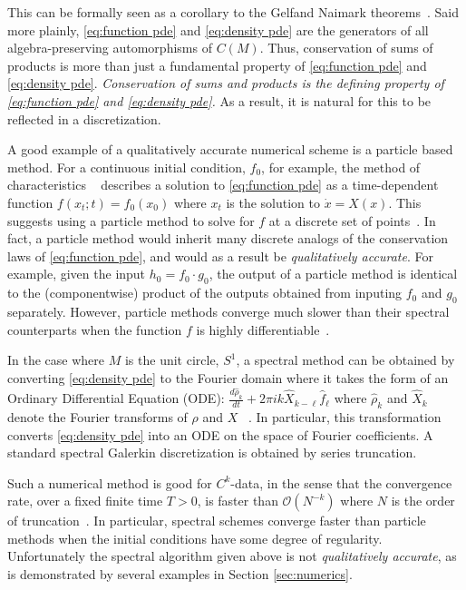\documentclass[final,leqno]{siamart}
\begin{document}
This can be formally seen as a corollary to the Gelfand Naimark theorems~\cite{GelfandNaimark1943}.
Said more plainly, \eqref{eq:function pde} and \eqref{eq:density pde} are the generators of all algebra-preserving automorphisms of $C(M)$.
Thus, conservation of sums of products is more than just a fundamental property of \eqref{eq:function pde} and \eqref{eq:density pde}.
\emph{Conservation of sums and products is the defining property of  \eqref{eq:function pde} and \eqref{eq:density pde}.}
As a result, it is natural for this to be reflected in a discretization.

A good example of a qualitatively accurate numerical scheme is a particle based method.
For a continuous initial condition, $f_0$, for example, the method of characteristics ~\cite{Evans2010} describes a solution to \eqref{eq:function pde} as a time-dependent function $f( x_{t} ;t) = f_{0}( x_{0} )$ where $x_{t}$ is the solution to $\dot{x} = X(x)$.
This suggests using a particle method to solve for $f$ at a discrete set of points~\cite{Leveque1992}.
In fact, a particle method would inherit many discrete analogs of the conservation laws of \eqref{eq:function pde}, and would as a result be \emph{qualitatively accurate}.
For example, given the input $h_{0} = f_{0} \cdot g_{0}$, the output of a particle method is identical to the (componentwise) product of the outputs obtained from inputing $f_{0}$ and $g_{0}$ separately.
However, particle methods converge much slower than their spectral counterparts when the function $f$ is highly differentiable~\cite{Gottlieb2001}.

In the case where $M$ is the unit circle, $S^{1}$, a spectral method can be obtained by converting \eqref{eq:density pde} to the Fourier domain where it takes the form
of an Ordinary Differential Equation (ODE):
$
	\frac{d \hat{\rho}_{k}}{dt} + 2\pi i k  \widehat{X}_{k-\ell} \hat{f}_{\ell} 
$
where $\hat{\rho}_{k}$ and $\widehat{X}_{k}$ denote the Fourier transforms of $\rho$ and $X$ ~\cite{Taylor1974}.
In particular, this transformation converts \eqref{eq:density pde} into an ODE on the space of Fourier coefficients.
A standard spectral Galerkin discretization is obtained by series truncation. 

Such a numerical method is good for $C^{k}$-data, in the sense that the convergence rate, over a fixed finite time $T>0$, is faster than $\mathcal{O}(N^{-k})$  where $N$ is the order of truncation~\cite{Gottlieb2001,Gottlieb1977numerical}.
In particular, spectral schemes converge faster than particle methods when the initial conditions have some degree of regularity.
Unfortunately the spectral algorithm given above is not \emph{qualitatively accurate}, as is demonstrated by several examples in Section \ref{sec:numerics}.
\end{document}
